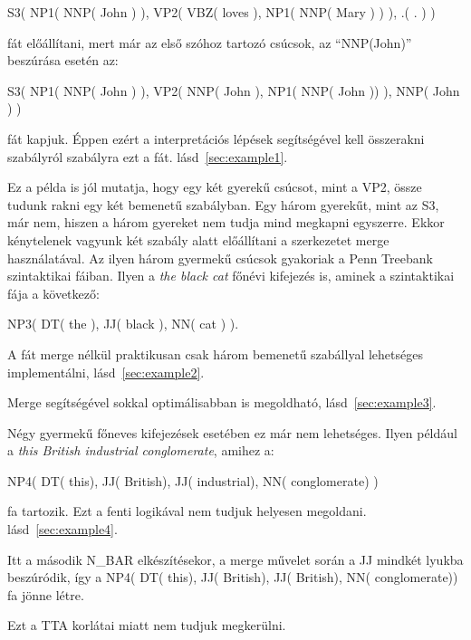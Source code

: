 S3( NP1( NNP( John ) ), VP2( VBZ( loves ),  NP1( NNP( Mary ) ) ), .( . ) )

fát előállítani, mert már az első szóhoz tartozó csúcsok, az “NNP(John)” beszúrása esetén az:

S3( NP1( NNP( John ) ), VP2( NNP( John ),  NP1( NNP( John )) ), NNP( John ) )

fát kapjuk. 
Éppen ezért a interpretációs lépések segítségével kell összerakni szabályról szabályra ezt a fát. 
lásd~\ref{sec:example1}.

Ez a példa is jól mutatja, hogy egy két gyerekű csúcsot, mint a VP2, össze tudunk rakni egy két bemenetű szabályban. Egy három gyerekűt, mint az S3, már nem, hiszen a három gyereket nem tudja mind megkapni egyszerre. Ekkor kénytelenek vagyunk két szabály alatt előállítani a szerkezetet merge használatával. Az ilyen három gyermekű csúcsok gyakoriak a Penn Treebank \cite{Marcus:1993} szintaktikai fáiban.  Ilyen a \textit{the black cat} főnévi kifejezés is, aminek a szintaktikai fája a következő:

NP3( DT( the ), JJ( black ), NN( cat ) ).

A fát merge nélkül praktikusan csak három bemenetű szabállyal lehetséges implementálni, lásd~\ref{sec:example2}.

Merge segítségével sokkal optimálisabban is megoldható, lásd~\ref{sec:example3}.

Négy gyermekű főneves kifejezések esetében ez már nem lehetséges. 
Ilyen például a \textit{this British industrial conglomerate}, amihez  a:

NP4( DT( this), JJ( British), JJ( industrial), NN( conglomerate) )

fa tartozik. Ezt a fenti logikával nem tudjuk helyesen megoldani. lásd~\ref{sec:example4}.

Itt a második N\_BAR elkészítésekor, a merge művelet során a JJ  mindkét lyukba beszúródik, így a NP4( DT( this), JJ( British), JJ( British), NN( conglomerate)) fa jönne létre.

Ezt a TTA korlátai miatt nem tudjuk megkerülni.


